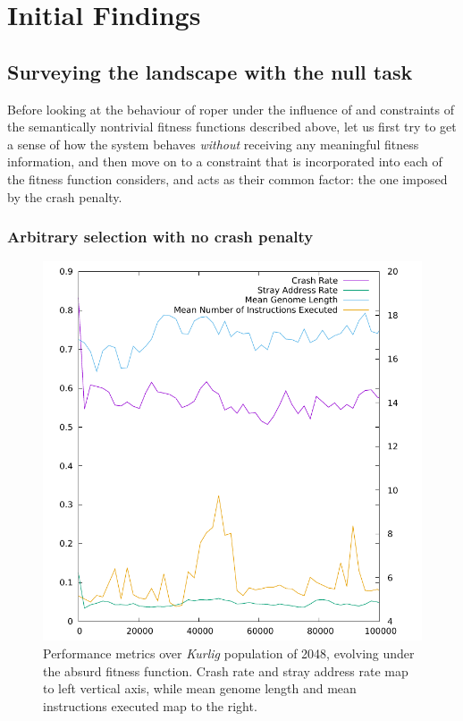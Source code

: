\documentclass[12pt,glossary]{dalthesis}
\begin{document}
\section{Initial Findings}
\label{sec:orgaa7a0f5}
\label{org5f12c78}

\subsection{Surveying the landscape with the null task}
\label{sec:orgf6d0ce1}
\label{org47d4621}

Before looking at the behaviour of \gls{roper} under the influence of and constraints
of the semantically nontrivial fitness functions described above, let us first try
to get a sense of how the system behaves \emph{without} receiving any meaningful fitness
information, and then move on to a constraint that is incorporated into each of the
fitness function considers, and acts as their common factor: the one imposed
by the crash penalty.

\subsubsection{Arbitrary selection with no crash penalty}
\label{sec:org66e6334}
\label{org331105e}

\begin{figure}[htbp]
\centering
\includegraphics[width=.9\linewidth]{../images/plots/kurlig_kafka_performance.pdf}
\caption{\label{fig:org8f0197c}
Performance metrics over \emph{Kurlig} population of 2048, evolving under the absurd fitness function. Crash rate and stray address rate map to left vertical axis, while mean genome length and mean instructions executed map to the right.}
\end{figure}
\end{document}
